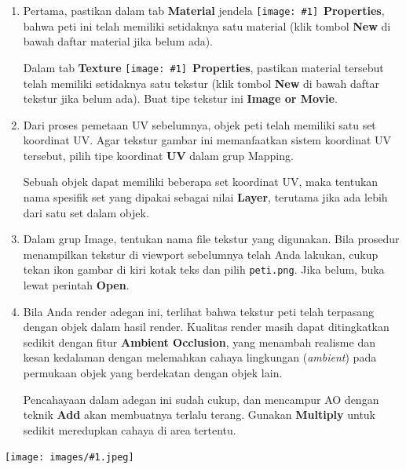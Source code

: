\documentclass[11pt]{report}
\newcommand{\fig}[1]{
  \begingroup
  \centering
  \texttt{[image: images/\#1.jpeg]}
  \label{fig:#1}
  \endgroup
}
\def\iconwnd#1{\texttt{[image: \#1]}}
\def\fontwnd#1{{\bfseries#1}}
\def\wndProperties{
  \iconwnd{icons/wndProperties.jpeg}~\fontwnd{Properties}}
\def\key#1{\fbox{\bfseries\ttfamily#1}}
\begin{document}
\begin{enumerate}
\item Pertama, pastikan dalam tab \textbf{Material} jendela \wndProperties, bahwa peti ini telah memiliki setidaknya satu material (klik tombol \textbf{New} di bawah daftar material jika belum ada). 

  Dalam tab \textbf{Texture} \wndProperties, pastikan material tersebut telah memiliki setidaknya satu tekstur (klik tombol \textbf{New} di bawah daftar tekstur jika belum ada). Buat tipe tekstur ini \textbf{Image or Movie}.

\item Dari proses pemetaan UV sebelumnya, objek peti telah memiliki satu set koordinat UV. Agar tekstur gambar ini memanfaatkan sistem koordinat UV tersebut, pilih tipe koordinat \textbf{UV} dalam grup \textsf{Mapping}.

  Sebuah objek dapat memiliki beberapa set koordinat UV, maka tentukan nama spesifik set yang dipakai sebagai nilai \textbf{Layer}, terutama jika ada lebih dari satu set dalam objek.

\item Dalam grup \textsf{Image}, tentukan nama file tekstur yang digunakan. Bila prosedur menampilkan tekstur di viewport sebelumnya telah Anda lakukan, cukup tekan ikon gambar di kiri kotak teks dan pilih \texttt{peti.png}. Jika belum, buka lewat perintah \textbf{Open}.

\item Bila Anda render \key{F12} adegan ini, terlihat bahwa tekstur peti telah terpasang dengan objek dalam hasil render. Kualitas render masih dapat ditingkatkan sedikit dengan fitur \textbf{Ambient Occlusion}, yang menambah realisme dan kesan kedalaman dengan melemahkan cahaya lingkungan (\emph{ambient}) pada permukaan objek yang berdekatan dengan objek lain.

  Pencahayaan dalam adegan ini sudah cukup, dan mencampur AO dengan teknik \textbf{Add} akan membuatnya terlalu terang. Gunakan \textbf{Multiply} untuk sedikit meredupkan cahaya di area tertentu.
\end{enumerate}

\fig{peti-009}
\end{document}
